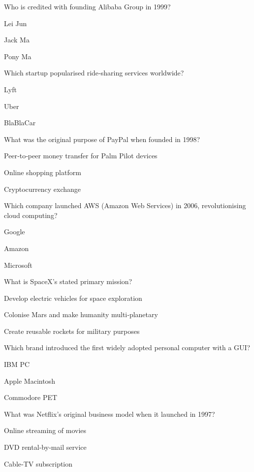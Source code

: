 \begin{enhancedmcq}{Who is credited with founding Alibaba Group in 1999?}
\item Lei Jun
\item Jack Ma
\item Pony Ma

\end{enhancedmcq}
\begin{enhancedmcq}{Which startup popularised ride‑sharing services worldwide?}
\item Lyft
\item Uber
\item BlaBlaCar

\end{enhancedmcq}
\begin{enhancedmcq}{What was the original purpose of PayPal when founded in 1998?}
\item Peer‑to‑peer money transfer for Palm Pilot devices
\item Online shopping platform
\item Cryptocurrency exchange

\end{enhancedmcq}
\begin{enhancedmcq}{Which company launched AWS (Amazon Web Services) in 2006, revolutionising cloud computing?}
\item Google
\item Amazon
\item Microsoft

\end{enhancedmcq}
\begin{enhancedmcq}{What is SpaceX's stated primary mission?}
\item Develop electric vehicles for space exploration
\item Colonise Mars and make humanity multi‑planetary
\item Create reusable rockets for military purposes

\end{enhancedmcq}
\begin{enhancedmcq}{Which brand introduced the first widely adopted personal computer with a GUI?}
\item IBM PC
\item Apple Macintosh
\item Commodore PET

\end{enhancedmcq}
\begin{enhancedmcq}{What was Netflix's original business model when it launched in 1997?}
\item Online streaming of movies
\item DVD rental‑by‑mail service
\item Cable‑TV subscription

\end{enhancedmcq}
